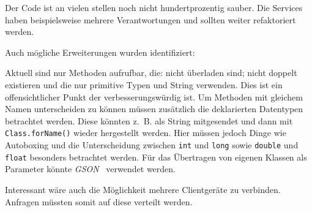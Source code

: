 Der Code ist an vielen stellen noch nicht hundertprozentig sauber. Die Services haben beispielsweise mehrere Verantwortungen und sollten weiter refaktoriert werden.

Auch mögliche Erweiterungen wurden identifiziert:

Aktuell sind nur Methoden aufrufbar, die: nicht überladen sind; nicht doppelt existieren und die nur primitive Typen und String verwenden. Dies ist ein offensichtlicher Punkt der verbesserungswürdig ist. Um Methoden mit gleichem Namen unterscheiden zu können müssen zusätzlich die deklarierten Datentypen betrachtet werden. Diese könnten z.~B. als String mitgesendet und dann mit \lstinline{Class.forName()} wieder hergestellt werden. Hier müssen jedoch Dinge wie Autoboxing und die Unterscheidung zwischen \lstinline{int} und \lstinline{long} sowie \lstinline{double} und \lstinline{float} besonders betrachtet werden. Für das Übertragen von eigenen Klassen als Parameter könnte \emph{GSON}~\cite{GoogleInc2014} verwendet werden.

Interessant wäre auch die Möglichkeit mehrere Clientgeräte zu verbinden. Anfragen müssten somit auf diese verteilt werden.
%
